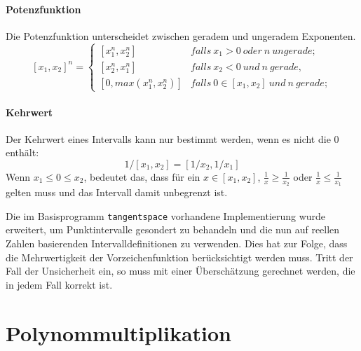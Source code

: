 \paragraph{Potenzfunktion}\label{par:potenzfunktion}
Die Potenzfunktion unterscheidet zwischen geradem und ungeradem Exponenten.
$$[x_1, x_2]^n =
 \begin{cases}
    [x_1^n, x_2^n] & falls\ x_1 > 0\ oder\ n\ ungerade; \\
    [x_2^n, x_1^n] & falls\ x_2 < 0\ und\ n\ gerade, \\
    [0, max(x_1^n, x_2^n)] & falls\ 0\in [x_1, x_2] \ und\ n\ gerade;
 \end{cases}$$

\paragraph{Kehrwert}
Der Kehrwert eines Intervalls kann nur bestimmt werden, wenn es nicht die 0 enthält:
$$
1/[x_1, x_2] = [1/x_2, 1/x_1]
$$
Wenn $x_1 \leq 0\leq x_2$, bedeutet das, dass für ein $x\in [x_1, x_2]$, $\frac{1}{x} \geq \frac{1}{x_2}$ oder $\frac{1}{x} \leq \frac{1}{x_1}$ gelten muss und das Intervall damit unbegrenzt ist.


Die im Basisprogramm \verb+tangentspace+ vorhandene Implementierung wurde erweitert, um Punktintervalle gesondert zu behandeln und die nun auf reellen Zahlen basierenden Intervalldefinitionen zu verwenden. Dies hat zur Folge, dass die Mehrwertigkeit der Vorzeichenfunktion berücksichtigt werden muss. Tritt der Fall der Unsicherheit ein, so muss mit einer Überschätzung gerechnet werden, die in jedem Fall korrekt ist.




\section{Polynommultiplikation}
\label{ch:Implementierung:sec:Abschnitt1}

